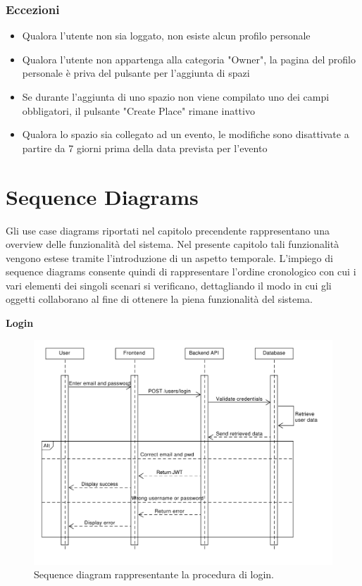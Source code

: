 \documentclass[9pt]{extarticle}
\begin{document}
\subsubsection*{Eccezioni}\label{Eccezioni-FR12-13}
\begin{itemize}
	\item Qualora l'utente non sia loggato, non esiste alcun profilo personale
	\item Qualora l'utente non appartenga alla categoria "Owner", la pagina del profilo personale è priva del pulsante per l'aggiunta di spazi
	\item Se durante l'aggiunta di uno spazio non viene compilato uno dei campi obbligatori, il pulsante "Create Place" rimane inattivo
	\item Qualora lo spazio sia collegato ad un evento, le modifiche sono disattivate a partire da 7 giorni prima della data prevista per l'evento
\end{itemize}

\newpage
\section{Sequence Diagrams}

Gli use case diagrams riportati nel capitolo precendente rappresentano una overview delle funzionalità del sistema. Nel presente capitolo tali funzionalità vengono estese tramite l'introduzione di un aspetto temporale. L'impiego di sequence diagrams consente quindi di rappresentare l'ordine cronologico con cui i vari elementi dei singoli scenari si verificano, dettagliando il modo in cui gli oggetti collaborano al fine di ottenere la piena funzionalità del sistema.

\textbf{Login}
\begin{figure}[!htb]
	\centering
	\includegraphics[width=\linewidth]{./images/SequenceDiagramLogin.pdf}
	\caption{Sequence diagram rappresentante la procedura di login.}
	\label{fig:SeqDiagLogin}
\end{figure}
\end{document}
